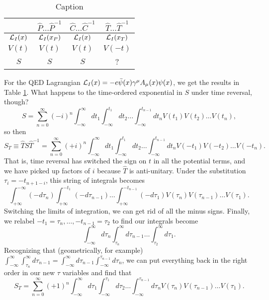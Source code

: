 \begin{table}[]
    \centering
    \begin{tabular}{c|c|c|c}
         & $\hat P\ldots \hat P^{-1}$ & $\hat C \ldots \hat C^{-1}$ & $\hat T \ldots \hat T^{-1}$ \\ \hline
         $\mathcal L_I(x)$ & $\mathcal L_I(x_P)$ & $\mathcal L_I(x)$ & $\mathcal L_I(x_T)$\\
         $V(t)$ & $V(t)$ & $V(t)$ & $V(-t)$\\
         $S$ & $S$ & $S$ & ?
    \end{tabular}
    \caption{Caption}
    \label{tab:qedsymmetries}
\end{table}
For the QED Lagrangian $\mathcal L_I(x)=-e \bar \psi(x) \gamma^\mu A_\mu (x) \psi(x)$, we get the results in Table \ref{tab:qedsymmetries}. What happens to the time-ordered exponential in $S$ under time reversal, though?
\begin{equation}
    S=\sum_{n=0}^\infty (-i)^n \int_{-\infty}^\infty dt_1 \int_{-\infty}^{t_1}dt_2 \ldots \int_{-\infty}^{t_{n-1}} dt_n V(t_1) V(t_2)\ldots V(t_n),
\end{equation}
so then
\begin{equation}
    S_T\equiv \hat T S \hat T^{-1} =\sum_{n=0}^\infty (+i)^n \int_{-\infty}^\infty dt_1 \int_{-\infty}^{t_1}dt_2 \ldots \int_{-\infty}^{t_{n-1}} dt_n V(-t_1) V(-t_2)\ldots V(-t_n).
\end{equation}
That is, time reversal has switched the sign on $t$ in all the potential terms, and we have picked up factors of $i$ because $\hat T$ is anti-unitary. Under the substitution $\tau_i = -t_{n+1-i}$, this string of integrals becomes
\begin{equation*}
    \int_{+\infty}^{-\infty} (-d\tau_n) \int_{+\infty}^{-t_1} (-d\tau_{n-1}) \ldots \int_{+\infty}^{-t_{n-1}} (-d\tau_1) V(\tau_n) V(\tau_{n-1})\ldots V(\tau_1).
\end{equation*}
Switching the limits of integration, we can get rid of all the minus signs. Finally, we relabel $-t_1=\tau_n, \ldots, -t_{n-1}=\tau_2$ to find our integrals become
\begin{equation*}
    \int_{-\infty}^\infty d\tau_n \int_{\tau_n}^\infty d\tau_{n-1} \ldots \int_{\tau_2}^\infty d\tau_1.
\end{equation*}
Recognizing that (geometrically, for example) $\int_{-\infty}^\infty \int_{\tau_n}^\infty d\tau_{n-1}=\int_{-\infty}^\infty d\tau_{n-1} \int_{-\infty}^{\tau_{n-1}}d\tau_n$, we can put everything back in the right order in our new $\tau$ variables and find that
\begin{equation}
    S_T = \sum_{n=0}^\infty (+1)^n \int_{-\infty}^\infty d\tau_1 \int_{-\infty}^{\tau_1}d\tau_2 \ldots \int_{-\infty}^{\tau_{n-1}} d\tau_n V(\tau_n) V(\tau_{n-1})\ldots V(\tau_1).
\end{equation}
